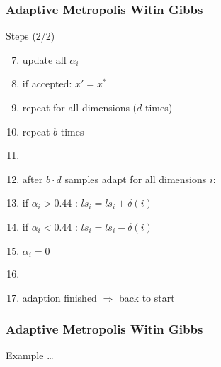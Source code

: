 \begin{frame}
\frametitle{Adaptive Metropolis Witin Gibbs}
\begin{block}{Steps (2/2)}
\begin{enumerate}
\setcounter{enumi}{6}
\item update all $\alpha_i$
\item if accepted: $x' = x^*$
\item repeat for all dimensions ($d$ times)
\item repeat $b$ times
\item[]
\item after $b\cdot d$ samples adapt for all dimensions $i$:
\item if $\alpha_i > 0.44$ : $ls_i = ls_i + \delta(i)$
\item if $\alpha_i < 0.44$ : $ls_i = ls_i - \delta(i)$
\item $\alpha_i = 0$
\item []
\item adaption finished $\Rightarrow$ back to start
\end{enumerate}
\end{block}
\end{frame}

\begin{frame}
\frametitle{Adaptive Metropolis Witin Gibbs}
Example \ldots
\end{frame}